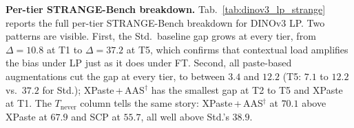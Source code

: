\begin{table}[!htp]%
\centering
\scriptsize
\setlength{\tabcolsep}{2pt}
\caption{\textbf{DINOv3 ViT-B/16 linear probe: per-tier
STRANGE-Bench breakdown.} The Std.\ gap grows at every tier, from $10.8$ at T1 to $37.2$ at T5; every paste row keeps it at $12.2$ or below, and XPaste\,+\,AAS$^{\dagger}$ \emph{(ours)} has the smallest gap at T2 to T5 ($3.4$ to $7.4$). F1$_{\text{micro}}$ (\%) of the typical (T) and atypical (A) arm of each tier and their gap $\Delta$; Mean T1--T5 is the mean over the five tiers ($T_{1\text{-}5}$ in Tab.~\ref{tab:dinov3_lp_main}); rows as in Tab.~\ref{tab:dinov3_lp_main}. Best per column in \textbf{bold}, second-best \underline{underlined}.}
\label{tab:dinov3_lp_strange}

\end{table}

\noindent\textbf{Per-tier STRANGE-Bench breakdown.}
Tab.~\ref{tab:dinov3_lp_strange} reports the full per-tier
STRANGE-Bench breakdown for DINOv3 LP. Two patterns are visible.
First, the Std.\ baseline gap grows at every tier, from $\Delta = 10.8$ at T1 to $\Delta = 37.2$ at T5, which confirms that contextual load amplifies the bias
under LP just as it does under FT. Second, all paste-based
augmentations cut the gap at every tier, to between $3.4$ and $12.2$ (T5: $7.1$ to $12.2$ vs.\ $37.2$ for Std.); XPaste\,+\,AAS$^{\dagger}$ has the smallest gap at T2 to T5 and XPaste at T1.
The $T_{\text{never}}$ column tells the same story: XPaste\,+\,AAS$^{\dagger}$ at $70.1$ above XPaste at $67.9$ and SCP at $55.7$, all well above Std.'s $38.9$.
